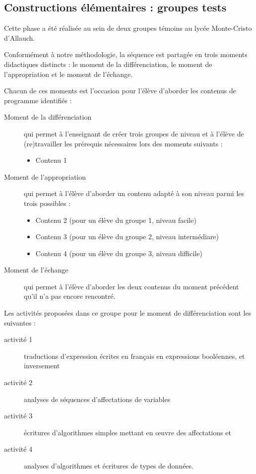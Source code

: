 
\subsection{Constructions élémentaires : groupes tests}
Cette phase a été réalisée au sein de deux groupes témoins au lycée Monte-Cristo d'Allauch.

Conformément à notre méthodologie, la séquence est partagée en trois moments didactiques distincts : le moment de la différenciation, le moment de l'appropriation et le moment de l'échange. 

Chacun de ces moments est l'occasion pour l'élève d'aborder les contenus de programme identifiés :

\begin{description}
    \item[Moment de la différenciation] qui permet à l'enseignant de créer trois groupes de niveau et à l'élève de (re)travailler les prérequis nécessaires lors des moments suivants :
    \begin{itemize}
        \item Contenu 1
    \end{itemize}
    \item[Moment de l'appropriation] qui permet à l'élève d'aborder un contenu adapté à son niveau parmi les trois possibles :
    \begin{itemize}
        \item Contenu 2 (pour un élève du groupe 1, niveau facile)
        \item Contenu 3 (pour un élève du groupe 2, niveau intermédiare)
        \item Contenu 4 (pour un élève du groupe 3, niveau difficile)
    \end{itemize}
    \item[Moment de l'échange] qui permet à l'élève d'aborder les deux contenus du moment précédent qu'il n'a pas encore rencontré.
\end{description}

Les activités proposées dans ce groupe pour le moment de différenciation sont les suivantes : 

\begin{description}
    \item[activité 1] traductions d'expression écrites en français en expressions booléennes, et inversement
    \item[activité 2] analyses de séquences d'affectations de variables
    \item[activité 3] écritures d'algorithmes simples mettant en œuvre des affectations et 
    \item[activité 4] analyses d'algorithmes et écritures de types de données.
\end{description}

